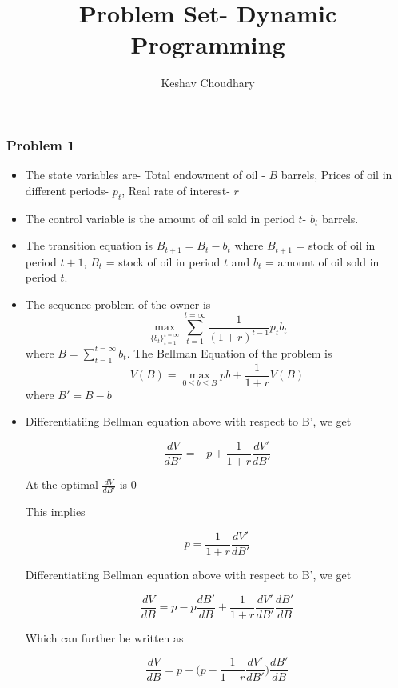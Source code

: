 \documentclass{article}
\title{Problem Set- Dynamic Programming}
\author{Keshav Choudhary}
\date{}
\begin{document}
  \maketitle

  \subsubsection*{Problem 1}

  \begin{itemize}
    \item The state variables are- Total endowment of oil - $B$ barrels, Prices of oil in different periods- $p_t$,
    Real rate of interest- $r$

    \item The control variable is the amount of oil sold in period $t$- $b_t$ barrels.

    \item The transition equation is $B_{t+1} = B_t - b_t$ where $B_{t+1}$ = stock of oil in period $t+1$,
    $B_t$ = stock of oil in period $t$ and $b_t$ = amount of oil sold in period $t$.


    \item The sequence problem of the owner is
    \begin{equation*}
      \max_{{\{b_t\}}_{t=1}^{t=\infty}}\sum_{t=1}^{t=\infty}\frac{1}{(1+r)^{t-1}}p_{t}b_{t}
    \end{equation*}
    where $B = \sum_{t=1}^{t=\infty}b_t$. The Bellman Equation of the problem is
    \begin{equation*}
      V(B) = \max_{0 \le b \le B} pb+ \frac{1}{1+r}V(B)
    \end{equation*}
    where $B' = B-b$

\item Differentiatiing Bellman equation above with respect to B', we get

$$ \frac {dV}{dB'} = -p + \frac{1}{1+r}\frac {dV'}{dB'}  $$

At the optimal $ \frac {dV}{dB'} $  is 0

This implies

$$ p = \frac{1}{1+r}\frac {dV'}{dB'}  $$

Differentiatiing Bellman equation above with respect to B', we get

$$ \frac {dV}{dB} = p - p \frac {dB'}{dB} + \frac{1}{1+r}\frac {dV'}{dB'}  \frac {dB'}{dB} $$

Which can further be written as

$$ \frac {dV}{dB} = p - \bigg(p  - \frac{1}{1+r}\frac {dV'}{dB'} \bigg) \frac {dB'}{dB} $$


\end{itemize}
\end{document}
